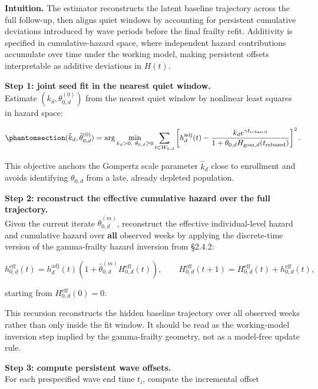 \documentclass[
]{article}
\begin{document}
\textbf{Intuition.} The estimator reconstructs the latent baseline
trajectory across the full follow-up, then aligns quiet windows by
accounting for persistent cumulative deviations introduced by wave
periods before the final frailty refit. Additivity is specified in
cumulative-hazard space, where independent hazard contributions
accumulate over time under the working model, making persistent offsets
interpretable as additive deviations in \(H(t)\).

\textbf{Step 1: joint seed fit in the nearest quiet window.}\\
Estimate \((k_d,\theta_{0,d}^{(0)})\) from the nearest quiet window by
nonlinear least squares in hazard space:

\begin{equation}\protect\phantomsection\label{eq:nls-objective}{
(\hat{k}_d,\hat{\theta}_{0,d}^{(0)})
=
\arg\min_{k_d>0,\ \theta_{0,d}\ge0}
\sum_{t \in W_{0,d}}
\left[
h_d^{\mathrm{adj}}(t)-
\frac{k_d e^{\gamma t_{\mathrm{rebased}}}}{1+\theta_{0,d} H_{\mathrm{gom},d}(t_{\mathrm{rebased}})}
\right]^2 .
}\end{equation}

This objective anchors the Gompertz scale parameter \(\hat{k}_d\) close
to enrollment and avoids identifying \(\theta_{0,d}\) from a late,
already depleted population.

\textbf{Step 2: reconstruct the effective cumulative hazard over the
full trajectory.}\\
Given the current iterate \(\hat{\theta}_{0,d}^{(m)}\), reconstruct the
effective individual-level hazard and cumulative hazard over
\textbf{all} observed weeks by applying the discrete-time version of the
gamma-frailty hazard inversion from §2.4.2:

\[
h_{0,d}^{\mathrm{eff}}(t)=h_d^{\mathrm{adj}}(t)\left(1+\hat{\theta}_{0,d}^{(m)}H_{0,d}^{\mathrm{eff}}(t)\right),
\qquad
H_{0,d}^{\mathrm{eff}}(t+1)=H_{0,d}^{\mathrm{eff}}(t)+h_{0,d}^{\mathrm{eff}}(t),
\]

starting from \(H_{0,d}^{\mathrm{eff}}(0)=0\).

This recursion reconstructs the hidden baseline trajectory over all
observed weeks rather than only inside the fit window. It should be read
as the working-model inversion step implied by the gamma-frailty
geometry, not as a model-free update rule.

\textbf{Step 3: compute persistent wave offsets.}\\
For each prespecified wave end time \(t_i\), compute the incremental
offset
\end{document}
